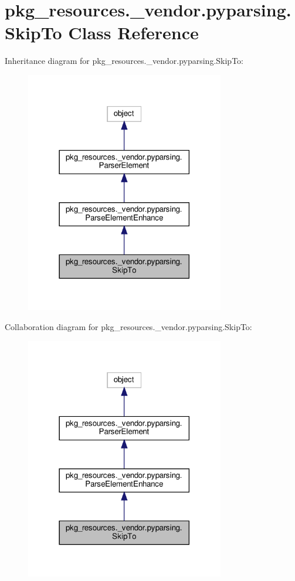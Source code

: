 \hypertarget{classpkg__resources_1_1__vendor_1_1pyparsing_1_1SkipTo}{}\section{pkg\+\_\+resources.\+\_\+vendor.\+pyparsing.\+Skip\+To Class Reference}
\label{classpkg__resources_1_1__vendor_1_1pyparsing_1_1SkipTo}


Inheritance diagram for pkg\+\_\+resources.\+\_\+vendor.\+pyparsing.\+Skip\+To\+:
\nopagebreak
\begin{figure}[H]
\begin{center}
\leavevmode
\includegraphics[width=246pt]{classpkg__resources_1_1__vendor_1_1pyparsing_1_1SkipTo__inherit__graph}
\end{center}
\end{figure}


Collaboration diagram for pkg\+\_\+resources.\+\_\+vendor.\+pyparsing.\+Skip\+To\+:
\nopagebreak
\begin{figure}[H]
\begin{center}
\leavevmode
\includegraphics[width=246pt]{classpkg__resources_1_1__vendor_1_1pyparsing_1_1SkipTo__coll__graph}
\end{center}
\end{figure}
